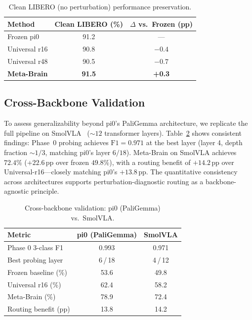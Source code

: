 \documentclass[10pt,twocolumn]{article}
\newcommand{\ours}{Meta-Brain}
\newcommand{\pp}{\,\text{pp}}
\begin{document}
\begin{table}[t]
\centering
\caption{Clean LIBERO (no perturbation) performance preservation.}
\label{tab:clean}
\small
\begin{tabular}{@{}lcc@{}}
\toprule
Method & Clean LIBERO (\%) & $\Delta$ vs.\ Frozen (pp) \\
\midrule
Frozen pi0 & 91.2 & --- \\
Universal r16 & 90.8 & $-0.4$ \\
Universal r48 & 90.5 & $-0.7$ \\
\textbf{\ours{}} & \textbf{91.5} & \textbf{+0.3} \\
\bottomrule
\end{tabular}
\end{table}


\subsection{Cross-Backbone Validation}
\label{sec:cross_backbone}

To assess generalizability beyond pi0's PaliGemma architecture, we replicate the full pipeline on SmolVLA~\cite{smolvla2025} (${\sim}12$ transformer layers).
Table~\ref{tab:cross_backbone} shows consistent findings:
Phase~0 probing achieves $\text{F1}{=}0.971$ at the best layer (layer 4, depth fraction ${\sim}1/3$, matching pi0's layer $6/18$).
\ours{} on SmolVLA achieves $72.4\%$ ($+22.6\pp$ over frozen $49.8\%$), with a routing benefit of $+14.2\pp$ over Universal-r16---closely matching pi0's $+13.8\pp$.
The quantitative consistency across architectures supports perturbation-diagnostic routing as a backbone-agnostic principle.

\begin{table}[t]
\centering
\caption{Cross-backbone validation: pi0 (PaliGemma) vs.\ SmolVLA.}
\label{tab:cross_backbone}
\small
\begin{tabular}{@{}lcc@{}}
\toprule
Metric & pi0 (PaliGemma) & SmolVLA \\
\midrule
Phase 0 3-class F1 & 0.993 & 0.971 \\
Best probing layer & 6\,/\,18 & 4\,/\,12 \\
Frozen baseline (\%) & 53.6 & 49.8 \\
Universal r16 (\%) & 62.4 & 58.2 \\
\ours{} (\%) & 78.9 & 72.4 \\
Routing benefit (pp) & 13.8 & 14.2 \\
\bottomrule
\end{tabular}
\end{table}
\end{document}
